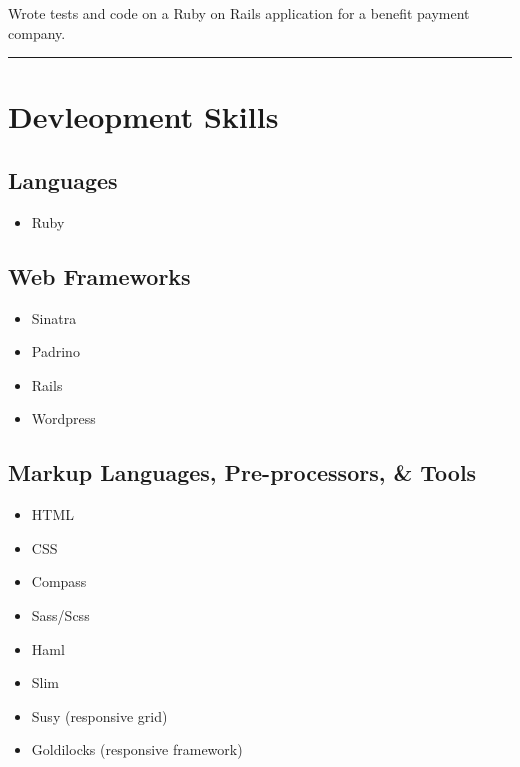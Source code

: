 \documentclass{article}
\begin{document}
  {\indent} Wrote tests and code on a Ruby on Rails application for a benefit 
  payment company.
  

\hrule
\section{Devleopment Skills} %
\label{sec:Devleopment Skills}

\begin{multicols}{3}
\subsection{Languages} %
\label{sub:Languages}

\begin{itemize}
  \item Ruby
\end{itemize}

\subsection{Web Frameworks} %
\label{sub:Web Frameworks}

\begin{itemize}
  \item Sinatra
  \item Padrino
  \item Rails
  \item Wordpress
\end{itemize}

\subsection{Markup Languages, Pre-processors, \& Tools} %
\label{sub:Markup Languages, Pre-processors, \& Tools}

\begin{itemize}
  \item HTML
  \item CSS
  \item Compass
  \item Sass/Scss
  \item Haml
  \item Slim
  \item Susy (responsive grid)
  \item Goldilocks (responsive framework)
\end{itemize}


\end{multicols}
\end{document}
